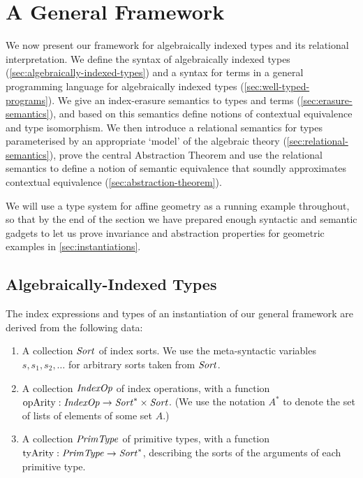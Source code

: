 \newcommand{\Gen}{\mathrm{Gen}}
\newcommand{\Free}{\mathrm{Free}}
\newcommand{\semSort}[1]{\llbracket #1 \rrbracket}
\newcommand{\semIndexExp}[1]{\llbracket #1 \rrbracket}
\newcommand{\semPrimType}[1]{\llbracket #1 \rrbracket}
\newcommand{\opsCtxt}{\Gamma_{\mathit{ops}}}
\newcommand{\opsEnv}{\eta_{\mathit{ops}}}
\newcommand{\ctxteq}[5]{{#1};{#2}\vdash{#3}\approx{#4}:{#5}}
\newcommand{\semeq}[5]{{#1};{#2}\models{#3}\sim{#4}:{#5}}
\section{A General Framework}
\label{sec:a-general-framework}

We now present our framework for algebraically indexed types and its
relational interpretation.  We define the syntax of algebraically
indexed types (\autoref{sec:algebraically-indexed-types}) and a syntax
for terms in a general programming language for algebraically indexed
types (\autoref{sec:well-typed-programs}). We give an index-erasure
semantics to types and terms (\autoref{sec:erasure-semantics}), and
based on this semantics define notions of contextual equivalence and
type isomorphism. We
then introduce a relational semantics for types parameterised by an appropriate
`model' of the algebraic theory (\autoref{sec:relational-semantics}),
prove the central Abstraction Theorem
and use the relational semantics
to define a notion of semantic equivalence that soundly approximates 
contextual equivalence (\autoref{sec:abstraction-theorem}).

We will use a type system for affine geometry as a running example
throughout, so that by the end of the section we have prepared enough
syntactic and semantic gadgets to let us prove invariance
and abstraction properties for geometric examples in
\autoref{sec:instantiations}.

\subsection{Algebraically-Indexed Types}
\label{sec:algebraically-indexed-types}

The index expressions and types of an instantiation of our general
framework are derived from the following data:
\begin{enumerate}
\item A collection $\mathit{Sort}$ of index sorts. We use the
  meta-syntactic variables $s,s_1,s_2,\ldots$ for arbitrary sorts taken
  from $\mathit{Sort}$.
\item A collection $\mathit{IndexOp}$ of index operations, with a function
  $\mathrm{opArity} : \mathit{IndexOp} \to \mathit{Sort}^* \times \mathit{Sort}$. (We use
  the notation $A^*$ to denote the set of lists of elements of some
  set $A$.)
\item A collection $\mathit{PrimType}$ of primitive types, with a function
  $\mathrm{tyArity} : \mathit{PrimType} \to \mathit{Sort}^*$, describing the sorts
  of the arguments of each primitive type.
\end{enumerate}

